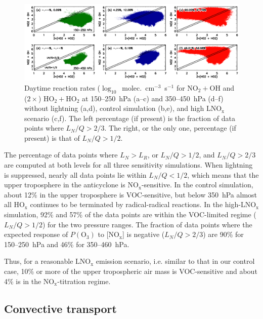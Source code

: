  \begin{figure}
 \noindent\includegraphics[width=40pc]{Figures/rxn.png}
 \caption[Daytime reaction rates]{Daytime reaction rates ($\log_{10}$~molec.~cm$^{-3}$~s$^{-1}$
for NO$_2+$OH and ($2\times$) HO$_2+$HO$_2$ at 150--250~hPa (a--c)
and 350--450~hPa (d--f) without lightning (a,d), control simulation (b,e),
and high LNO$_{\mathrm{x}}$ scenario (c,f). The left percentage (if present) is the fraction
of data points where $L_N/Q>2/3$. The right, or the only one, percentage (if present) is that
of $L_N/Q>1/2$.}
 \label{fig:ltng_rxn}
 \end{figure}

The percentage of data points where $L_N>L_R$, or $L_N/Q>1/2$, and
$L_N/Q>2/3$ are computed at both levels for all three sensitivity simulations. When
lightning is suppressed, nearly all data points lie within $L_N/Q<1/2$,
which means that the upper troposphere in the anticyclone is NO$_\mathrm{x}$-sensitive.
In the control simulation, about 12\% in the upper troposphere is VOC-sensitive,
but below 350~hPa almost all HO$_\mathrm{x}$ continues to
be terminated by radical-radical reactions. In the high-LNO$_\mathrm{x}$
simulation, 92\% and 57\% of the data points are within the VOC-limited regime
($L_N/Q>1/2$) for the two pressure ranges. The fraction of data points
where the expected response of $P(\mathrm{O_3})$ to [NO$_\mathrm{x}$]
is negative ($L_N/Q>2/3$) are 90\% for 150--250~hPa and 46\% for
350--460~hPa.

Thus, for a reasonable $\mathrm{LNO_x}$ emission scenario, i.e. similar to that
in our control case, 10\% or more of the upper tropospheric air mass is
VOC-sensitive and about 4\% is in the $\mathrm{NO_x}$-titration regime.

\subsection{Convective transport}

